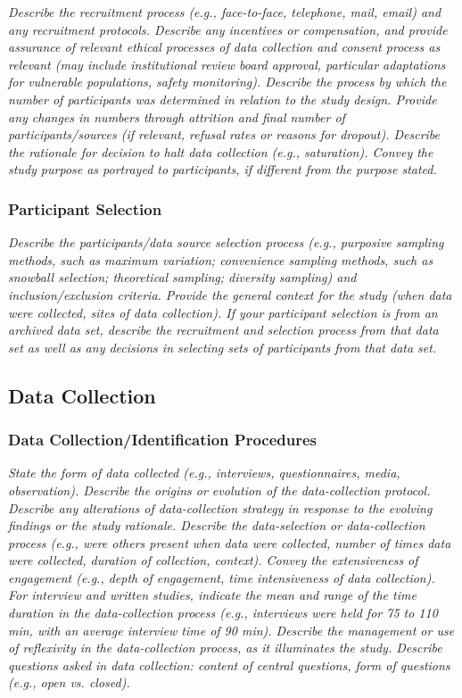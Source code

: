 \documentclass[acmsmall]{acmart}
\begin{document}
{\em\small Describe the recruitment process (e.g., face-to-face, telephone, mail, email) and any recruitment protocols. Describe any incentives or compensation, and provide assurance of relevant ethical processes of data collection and consent process as relevant (may include institutional review board approval, particular adaptations for vulnerable populations, safety monitoring). Describe the process by which the number of participants was determined in relation to the
study design. Provide any changes in numbers through attrition and final number of participants/sources (if relevant, refusal rates or reasons for dropout). Describe the rationale for decision to halt data collection (e.g., saturation). Convey the study purpose as portrayed to participants, if different from the purpose stated. }

\subsubsection{Participant Selection}

{\em\small Describe the participants/data source selection process (e.g., purposive sampling methods, such as maximum variation; convenience sampling methods, such as snowball selection; theoretical sampling; diversity sampling) and inclusion/exclusion criteria. Provide the general context for the study (when data were collected, sites of data collection). If your participant selection is from an archived data set, describe the recruitment and selection process from that data set as well as any decisions in selecting sets of participants from that data set. }

\subsection{Data Collection}

\subsubsection{Data Collection/Identification Procedures}

{\em\small State the form of data collected (e.g., interviews, questionnaires, media, observation). Describe the origins or evolution of the data-collection protocol. Describe any alterations of data-collection strategy in response to the evolving findings or the study rationale. Describe the data-selection or data-collection process (e.g., were others present when data were collected, number of times data were collected, duration of collection, context). Convey the extensiveness of engagement (e.g., depth of engagement, time intensiveness of data collection). For interview and written studies, indicate the mean and range of the time duration in the data-collection process (e.g., interviews were held for 75 to 110 min, with an average interview time of 90 min). Describe the management or use of reflexivity in the data-collection process, as it
illuminates the study. Describe questions asked in data collection: content of central questions, form of questions (e.g., open vs. closed). }
\end{document}
